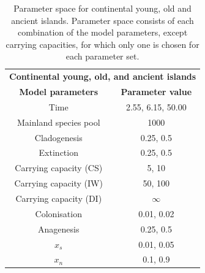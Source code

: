\begin{table}[ht]
    \centering
    \caption{Parameter space for continental young, old and ancient islands. Parameter space consists of each combination of the model parameters, except carrying capacities, for which only one is chosen for each parameter set.}
    \begin{tabular}{ c | c }
        \multicolumn{2}{c}{\textbf{Continental young, old, and ancient islands}} \\
        \textbf{Model parameters} & \textbf{Parameter value} \\ 
        \hline
        \hline
        Time & 2.55, 6.15, 50.00 \\
        \hline
        Mainland species pool & 1000 \\
        \hline
        Cladogenesis & 0.25, 0.5 \\
        \hline
        Extinction & 0.25, 0.5 \\
        \hline
        Carrying capacity (CS) & 5, 10 \\
        \hline
        Carrying capacity (IW) & 50, 100 \\
        \hline
        Carrying capacity (DI) & $\infty$ \\
        \hline
        Colonisation & 0.01, 0.02 \\
        \hline
        Anagenesis & 0.25, 0.5 \\
        \hline
        $x_s$ & 0.01, 0.05 \\
        \hline
        $x_n$ & 0.1, 0.9 \\
    \end{tabular}
    \label{tab:continental}
\end{table}

